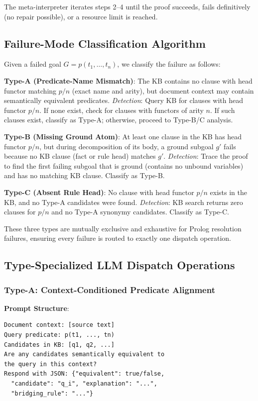 \documentclass[11pt,letterpaper]{article}
\begin{document}
The meta-interpreter iterates steps 2--4 until the proof succeeds, fails definitively (no repair possible), or a resource limit is reached.

\subsection{Failure-Mode Classification Algorithm}

Given a failed goal $G = p(t_1, \ldots, t_n)$, we classify the failure as follows:

\textbf{Type-A (Predicate-Name Mismatch)}: The KB contains no clause with head functor matching $p/n$ (exact name and arity), but document context may contain semantically equivalent predicates. \emph{Detection}: Query KB for clauses with head functor $p/n$. If none exist, check for clauses with functors of arity $n$. If such clauses exist, classify as Type-A; otherwise, proceed to Type-B/C analysis.

\textbf{Type-B (Missing Ground Atom)}: At least one clause in the KB has head functor $p/n$, but during decomposition of its body, a ground subgoal $g'$ fails because no KB clause (fact or rule head) matches $g'$. \emph{Detection}: Trace the proof to find the first failing subgoal that is ground (contains no unbound variables) and has no matching KB clause. Classify as Type-B.

\textbf{Type-C (Absent Rule Head)}: No clause with head functor $p/n$ exists in the KB, and no Type-A candidates were found. \emph{Detection}: KB search returns zero clauses for $p/n$ and no Type-A synonymy candidates. Classify as Type-C.

These three types are mutually exclusive and exhaustive for Prolog resolution failures, ensuring every failure is routed to exactly one dispatch operation.

\subsection{Type-Specialized LLM Dispatch Operations}

\subsubsection{Type-A: Context-Conditioned Predicate Alignment}

\textbf{Prompt Structure}:
\begin{lstlisting}
Document context: [source text]
Query predicate: p(t1, ..., tn)
Candidates in KB: [q1, q2, ...]
Are any candidates semantically equivalent to
the query in this context?
Respond with JSON: {"equivalent": true/false,
  "candidate": "q_i", "explanation": "...",
  "bridging_rule": "..."}
\end{lstlisting}
\end{document}
